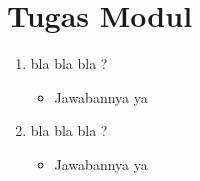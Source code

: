 \section*{Tugas Modul} %
\begin{enumerate}
  \item bla bla bla ?
        \begin{itemize}
          \item Jawabannya ya
        \end{itemize}
  \item bla bla bla ?
        \begin{itemize}
          \item Jawabannya ya
        \end{itemize}
\end{enumerate}
